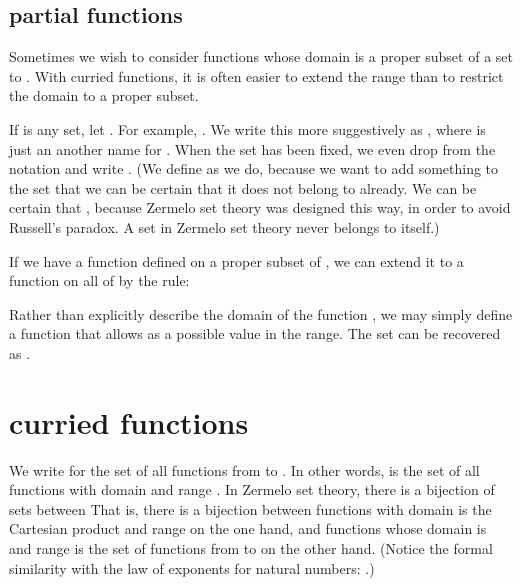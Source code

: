 \documentclass[cup9a]{cupbook}
\begin{document}
\subsection{partial functions}

Sometimes we wish to consider functions whose domain is a proper subset of a set  to .  With curried functions, it is often easier to extend the range than to restrict the domain to a proper subset.

If  is any set, let .  For example,
.  We write this more suggestively
as , where  is just an
another name for .  When the set  has been fixed, we even drop
 from the notation and write .
(We define  as we do, because we want to add something to the set 
that we can be certain that it does not belong to  already.  We can
be certain that , because Zermelo set theory was designed this
way, in order to avoid Russell's paradox.  A set in Zermelo set theory
never belongs to itself.)

If we have a function  defined on a proper subset  of , we can
extend it to a function  on all of  by the rule:

Rather than explicitly describe the domain of the function , we may simply
define a function  that allows  as a possible value in the range.  The set  can be recovered as
.







\section{curried functions}

We write  for the set of all functions from  to .  In other
words,  is the set of all functions with domain  and range .
In Zermelo set theory, there is a bijection of sets between
That is, there is a bijection between functions with domain is the Cartesian product  and range  on the one hand, and functions whose domain is  and range is the set of functions from  to  on the other hand.
(Notice the formal similarity with the law of exponents for natural numbers:
.)
\end{document}
